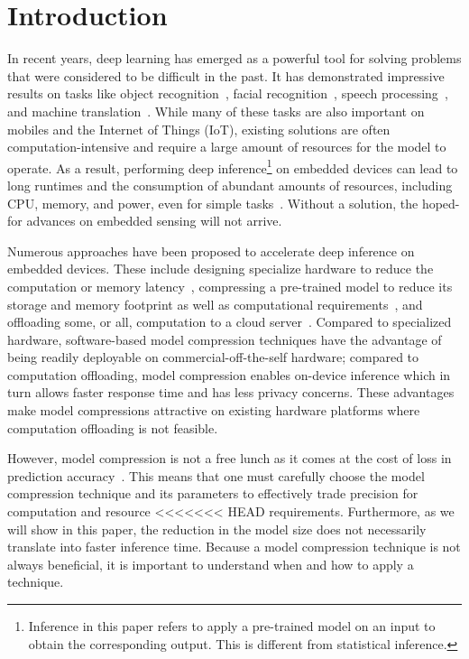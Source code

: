 \section{Introduction}
In recent years, deep learning has emerged as a powerful tool for solving problems that were considered to be difficult in the past. It has
demonstrated impressive results on tasks like object recognition~\cite{donahue14,he2016deep}, facial
recognition~\cite{parkhi2015deep,sun2014deep}, speech processing~\cite{pmlrv48amodei16}, and machine translation~\cite{bahdanau2014neural}.
While many of these tasks are also important on mobiles and the Internet of Things (IoT), existing solutions are often
computation-intensive and require a large amount of resources for the model to operate. As a result, performing deep
inference\footnote{Inference in this paper refers to apply a pre-trained model on an input to obtain the corresponding output. This is
different from statistical inference.} on embedded devices can lead to long runtimes and the consumption of abundant amounts of resources,
including CPU, memory, and power, even for simple tasks~\cite{CanzianiPC16}. Without a solution,
 the hoped-for advances on embedded sensing will not arrive.


Numerous approaches have been proposed to accelerate deep inference on embedded devices. These include designing specialize hardware to
reduce the computation or memory latency~\cite{}, compressing a pre-trained model to reduce its storage and memory footprint as well as
computational requirements~\cite{}, and offloading some, or all, computation to a cloud
server~\cite{Kang2017neurosurgeon,teerapittayanon2017distributed}. Compared to specialized hardware, software-based model compression
techniques have the advantage of being readily deployable on commercial-off-the-self hardware; compared to computation offloading, model
compression enables on-device inference which in turn allows faster response time and has less privacy concerns. These advantages make
model compressions attractive on existing hardware platforms where computation offloading is not feasible.


However, model compression is not a free lunch as it comes at the cost of loss in prediction accuracy~\cite{}. This means that one must
carefully choose the model compression technique and its parameters to effectively trade precision for computation and resource
<<<<<<< HEAD
requirements. Furthermore, as we will show in this paper, the reduction in the model size does not necessarily translate into faster
inference time. Because a model compression technique is not always beneficial, it is important to understand when and how to apply a
 technique.

